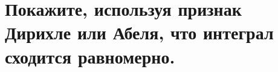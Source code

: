 \documentclass[a4paper, fleqn]{article}
\begin{document}



\section*{Покажите, используя признак Дирихле или Абеля, что интеграл сходится равномерно.}







\end{document}
